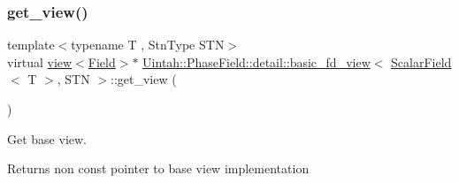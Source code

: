 \subsubsection{\texorpdfstring{get\+\_\+view()}{get\_view()}\hspace{0.1cm}{\footnotesize\ttfamily [1/2]}}
{\footnotesize\ttfamily template$<$typename T , Stn\+Type S\+TN$>$ \\
virtual \hyperlink{classUintah_1_1PhaseField_1_1detail_1_1view}{view}$<$\hyperlink{structUintah_1_1PhaseField_1_1ScalarField}{Field}$>$$\ast$ \hyperlink{classUintah_1_1PhaseField_1_1detail_1_1basic__fd__view}{Uintah\+::\+Phase\+Field\+::detail\+::basic\+\_\+fd\+\_\+view}$<$ \hyperlink{structUintah_1_1PhaseField_1_1ScalarField}{Scalar\+Field}$<$ T $>$, S\+TN $>$\+::get\+\_\+view (\begin{DoxyParamCaption}{ }\end{DoxyParamCaption})\hspace{0.3cm}{\ttfamily [pure virtual]}}



Get base view. 

\begin{DoxyReturn}{Returns}
non const pointer to base view implementation 
\end{DoxyReturn}


